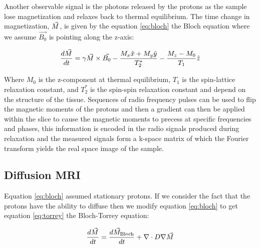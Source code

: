 Another observable signal is the photons released by the protons as the sample lose magnetization and relaxes back to thermal equilibrium. The time change in magnetization, $\vec{M}$, is given by the equation \ref{eq:bloch} the Bloch equation where we assume $\vec{B_0}$ is pointing along the z-axis:

\begin{equation}
    \frac{d \vec{M}}{dt} = \gamma \vec{M} \times \vec{B_0} - \frac{M_x \hat{x} + M_y \hat{y}}{T_2^*} - \frac{M_z - M_0}{T_1}\hat{z}
    \label{eq:bloch}
\end{equation}

Where $M_0$ is the z-component at thermal equilibrium, $T_1$ is the spin-lattice relaxation constant, and $T_2^*$ is the spin-spin relaxation constant and depend on the structure of the tissue. \cite{bushberg2011essential} Sequences of radio frequency pulses can be used to flip the magnetic moments of the protons and then a gradient can then be applied within the slice to cause the magnetic moments to precess at specific frequencies and phases, this information is encoded in the radio signals produced during relaxation and the measured \mr signals form a k-space matrix of which the Fourier transform yields the real space image of the sample.





\subsection{Diffusion MRI}

Equation \ref{eq:bloch} assumed stationary protons. If we consider the fact that the protons have the ability to diffuse then we modify equation \ref{eq:bloch} to get equation \ref{eq:torrey} the Bloch-Torrey equation:

\begin{equation}
    \frac{d \vec{M}}{dt} = \frac{d \vec{M}_{\text{Bloch}}}{dt} + \nabla \cdot D \nabla \vec{M}
    \label{eq:torrey}
\end{equation}

